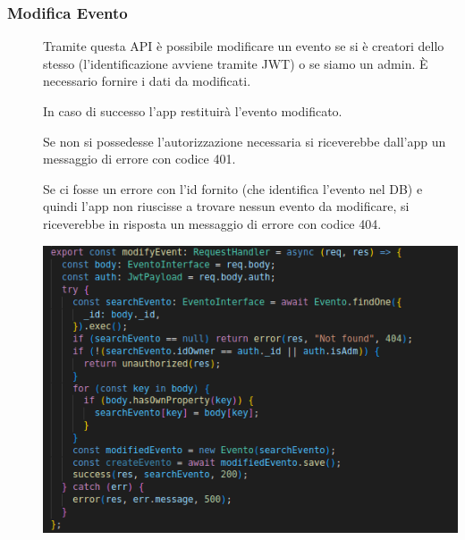 \documentclass{article}
\begin{document}
\subsubsection{Modifica Evento}
\begin{description}
    \item[] Tramite questa API è possibile modificare un evento se si è creatori dello stesso (l'identificazione avviene tramite JWT) o se siamo un admin. È necessario fornire i dati da modificati.
    \item[] In caso di successo l'app restituirà l'evento modificato.
    \item[] Se non si possedesse l'autorizzazione necessaria si riceverebbe dall'app un messaggio di errore con codice 401.
    \item[] Se ci fosse un errore con l'id fornito (che identifica l'evento nel DB) e quindi l'app non riuscisse a trovare nessun evento da modificare, si riceverebbe in risposta un messaggio di errore con codice 404.
    \item[] \begin{center}
            \includegraphics[scale=0.5]{modifyEvent.png}
        \end{center}
\end{description}
\end{document}
